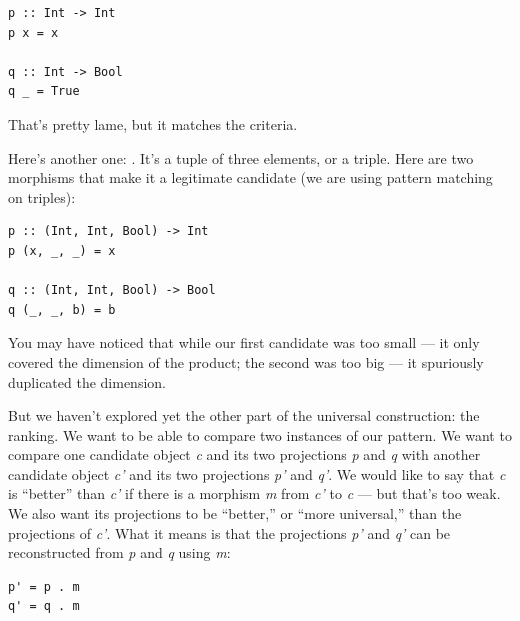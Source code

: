 \begin{verbatim}
p :: Int -> Int
p x = x

q :: Int -> Bool
q _ = True
\end{verbatim}

\noindent
That's pretty lame, but it matches the criteria.

Here's another one: . It's a tuple of three
elements, or a triple. Here are two morphisms that make it a legitimate
candidate (we are using pattern matching on triples):

\begin{verbatim}
p :: (Int, Int, Bool) -> Int
p (x, _, _) = x

q :: (Int, Int, Bool) -> Bool
q (_, _, b) = b
\end{verbatim}

\noindent
You may have noticed that while our first candidate was too small --- it
only covered the  dimension of the product; the second was
too big --- it spuriously duplicated the  dimension.

But we haven't explored yet the other part of the universal
construction: the ranking. We want to be able to compare two instances
of our pattern. We want to compare one candidate object \emph{c} and its
two projections \emph{p} and \emph{q} with another candidate object
\emph{c'} and its two projections \emph{p'} and \emph{q'}. We would like
to say that \emph{c} is ``better'' than \emph{c'} if there is a morphism
\emph{m} from \emph{c'} to \emph{c} --- but that's too weak. We also
want its projections to be ``better,'' or ``more universal,'' than the
projections of \emph{c'}. What it means is that the projections
\emph{p'} and \emph{q'} can be reconstructed from \emph{p} and \emph{q}
using \emph{m}:

\begin{verbatim}
p' = p . m
q' = q . m
\end{verbatim}

\begin{figure}[H]
  \centering
\end{figure}

